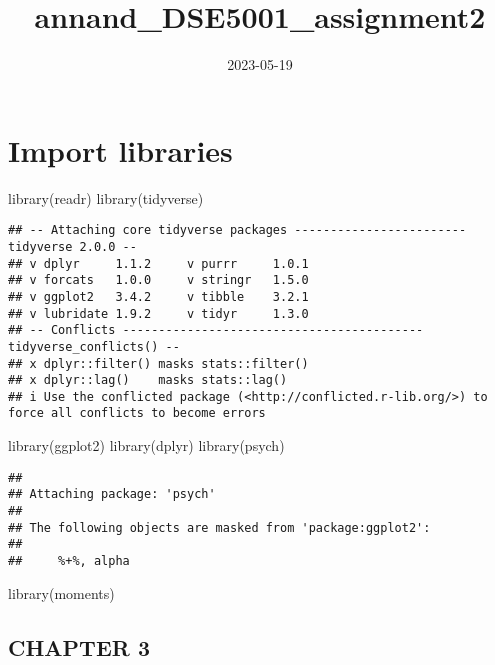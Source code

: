 \documentclass[
]{article}
\title{annand\_DSE5001\_assignment2}
\author{}
\date{\vspace{-2.5em}2023-05-19}
\newenvironment{Shaded}{\begin{snugshade}}{\end{snugshade}}
\newcommand{\FunctionTok}[1]{\textcolor[rgb]{0.00,0.00,0.00}{#1}}
\newcommand{\NormalTok}[1]{#1}
\begin{document}
\maketitle

\hypertarget{import-libraries}{%
\section{Import libraries}\label{import-libraries}}

\begin{Shaded}
\begin{Highlighting}[]
\FunctionTok{library}\NormalTok{(readr)}
\FunctionTok{library}\NormalTok{(tidyverse)}
\end{Highlighting}
\end{Shaded}

\begin{verbatim}
## -- Attaching core tidyverse packages ------------------------ tidyverse 2.0.0 --
## v dplyr     1.1.2     v purrr     1.0.1
## v forcats   1.0.0     v stringr   1.5.0
## v ggplot2   3.4.2     v tibble    3.2.1
## v lubridate 1.9.2     v tidyr     1.3.0
## -- Conflicts ------------------------------------------ tidyverse_conflicts() --
## x dplyr::filter() masks stats::filter()
## x dplyr::lag()    masks stats::lag()
## i Use the conflicted package (<http://conflicted.r-lib.org/>) to force all conflicts to become errors
\end{verbatim}

\begin{Shaded}
\begin{Highlighting}[]
\FunctionTok{library}\NormalTok{(ggplot2)}
\FunctionTok{library}\NormalTok{(dplyr)}
\FunctionTok{library}\NormalTok{(psych)}
\end{Highlighting}
\end{Shaded}

\begin{verbatim}
## 
## Attaching package: 'psych'
## 
## The following objects are masked from 'package:ggplot2':
## 
##     %+%, alpha
\end{verbatim}

\begin{Shaded}
\begin{Highlighting}[]
\FunctionTok{library}\NormalTok{(moments)}
\end{Highlighting}
\end{Shaded}

\hypertarget{chapter-3}{%
\subsection{CHAPTER 3}\label{chapter-3}}
\end{document}
